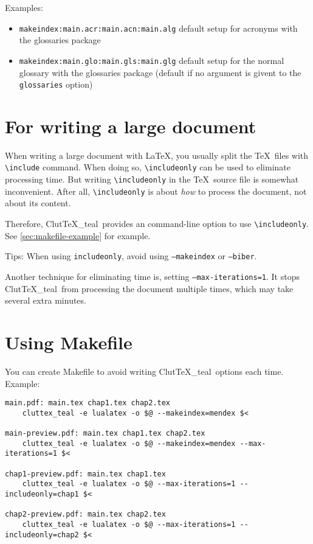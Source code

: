 \documentclass[a4paper]{report}
\newcommand\ClutTeX{Clut\TeX\_teal}
\newcommand\texcmd[1]{\texttt{\textbackslash #1}}
\begin{document}
Examples:
\begin{itemize}
	\item  \texttt{makeindex:main.acr:main.acn:main.alg}
		\newline
		default setup for
		acronyms with the glossaries package
	\item \texttt{makeindex:main.glo:main.gls:main.glg}
		\newline
		default setup for the
		normal glossary with the glossaries package
		\newline
		(default if no argument is givent to the \texttt{glossaries} option)
\end{itemize}

\section{For writing a large document}
When writing a large document with \LaTeX, you usually split the \TeX\ files with \texcmd{include} command.
When doing so, \texcmd{includeonly} can be used to eliminate processing time.
But writing \texcmd{includeonly} in the \TeX\ source file is somewhat inconvenient.
After all, \texcmd{includeonly} is about \emph{how} to process the document, not about its content.

Therefore, \ClutTeX\ provides an command-line option to use \texcmd{includeonly}.
See \autoref{sec:makefile-example} for example.

Tips: When using \texttt{includeonly}, avoid using \texttt{--makeindex} or \texttt{--biber}.

Another technique for eliminating time is, setting \texttt{--max-iterations=1}.
It stops \ClutTeX\ from processing the document multiple times, which may take several extra minutes.

\section{Using Makefile}\label{sec:makefile-example}
You can create Makefile to avoid writing \ClutTeX\ options each time.
Example:
\begin{verbatim}
main.pdf: main.tex chap1.tex chap2.tex
    cluttex_teal -e lualatex -o $@ --makeindex=mendex $<

main-preview.pdf: main.tex chap1.tex chap2.tex
    cluttex_teal -e lualatex -o $@ --makeindex=mendex --max-iterations=1 $<

chap1-preview.pdf: main.tex chap1.tex
    cluttex_teal -e lualatex -o $@ --max-iterations=1 --includeonly=chap1 $<

chap2-preview.pdf: main.tex chap2.tex
    cluttex_teal -e lualatex -o $@ --max-iterations=1 --includeonly=chap2 $<
\end{verbatim}
\end{document}
